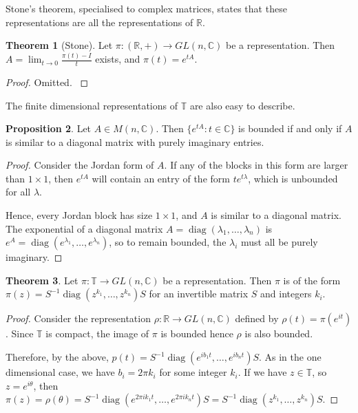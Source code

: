 \documentclass[12pt, a4paper]{article}
\theoremstyle{definition}
\newtheorem{theorem}{Theorem}[section]
\newtheorem{prop}[theorem]{Proposition}
\DeclareMathOperator{\diag}{diag}
\begin{document}
Stone's theorem, specialised to complex matrices, states that these representations are all the representations of $\mathbb{R}$.

\begin{theorem}[Stone]
Let $\pi : (\mathbb{R}, +) \to GL(n, \mathbb{C})$ be a representation. Then $A = \lim_{t \to 0} \frac{\pi(t) - I}{t}$ exists, and $\pi(t) = e^{tA}$.
\end{theorem}
\begin{proof}
Omitted. \cite{moller}
\end{proof}

The finite dimensional representations of $\mathbb{T}$ are also easy to describe.

\begin{prop}
Let $A \in M(n, \mathbb{C})$. Then $\{e^{tA} : t \in \mathbb{C} \}$ is bounded if and only if $A$ is similar to a diagonal matrix with purely imaginary entries.
\end{prop}
\begin{proof}
Consider the Jordan form of $A$. If any of the blocks in this form are larger than $1 \times 1$, then $e^{tA}$ will contain an entry of the form $t e^{t \lambda}$, which is unbounded for all $\lambda$.

Hence, every Jordan block has size $1 \times 1$, and $A$ is similar to a diagonal matrix. The exponential of a diagonal matrix $A = \diag(\lambda_1, \dots, \lambda_n)$ is $e^A = \diag(e^{\lambda_1}, \dots, e^{\lambda_n})$, so to remain bounded, the $\lambda_i$ must all be purely imaginary.
\end{proof}

\begin{theorem}
Let $\pi : \mathbb{T} \to GL(n, \mathbb{C})$ be a representation. Then $\pi$ is of the form $\pi(z) = S^{-1} \diag(z^{k_1}, \dots, z^{k_n}) S$ for an invertible matrix $S$ and integers $k_i$.
\end{theorem}
\begin{proof}
Consider the representation $\rho : \mathbb{R} \to GL(n, \mathbb{C})$ defined by $\rho(t) = \pi(e^{it})$. Since $\mathbb{T}$ is compact, the image of $\pi$ is bounded hence $\rho$ is also bounded.

Therefore, by the above, $p(t) = S^{-1} \diag(e^{i b_1 t}, \dots, e^{i b_n t}) S$. As in the one dimensional case, we have $b_i = 2 \pi k_i$ for some integer $k_i$. If we have $z \in \mathbb{T}$, so $z = e^{i \theta}$, then $\pi(z) = \rho(\theta) = S^{-1} \diag(e^{2 \pi i k_1 t}, \dots, e^{2 \pi i k_n t}) S = S^{-1} \diag(z^{k_1}, \dots, z^{k_n}) S$.
\end{proof}
\end{document}
